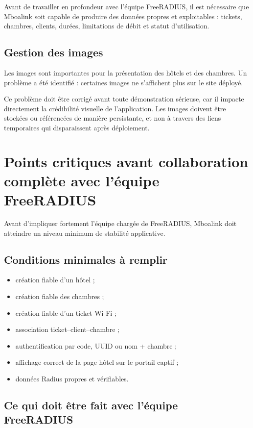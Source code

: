 \documentclass[12pt,a4paper]{article}
\begin{document}
Avant de travailler en profondeur avec l'équipe FreeRADIUS, il est nécessaire que Mboalink soit capable de produire des données propres et exploitables : tickets, chambres, clients, durées, limitations de débit et statut d'utilisation.

\subsection{Gestion des images}

Les images sont importantes pour la présentation des hôtels et des chambres. Un problème a été identifié : certaines images ne s'affichent plus sur le site déployé.

Ce problème doit être corrigé avant toute démonstration sérieuse, car il impacte directement la crédibilité visuelle de l'application. Les images doivent être stockées ou référencées de manière persistante, et non à travers des liens temporaires qui disparaissent après déploiement.

\section{Points critiques avant collaboration complète avec l'équipe FreeRADIUS}

Avant d'impliquer fortement l'équipe chargée de FreeRADIUS, Mboalink doit atteindre un niveau minimum de stabilité applicative.

\subsection{Conditions minimales à remplir}

\begin{itemize}
  \item création fiable d'un hôtel ;
  \item création fiable des chambres ;
  \item création fiable d'un ticket Wi-Fi ;
  \item association ticket--client--chambre ;
  \item authentification par code, UUID ou nom + chambre ;
  \item affichage correct de la page hôtel sur le portail captif ;
  \item données Radius propres et vérifiables.
\end{itemize}

\subsection{Ce qui doit être fait avec l'équipe FreeRADIUS}
\end{document}
